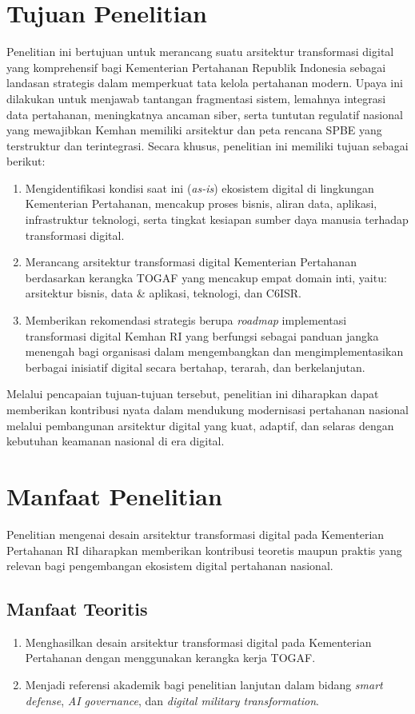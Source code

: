 \section{Tujuan Penelitian}
Penelitian ini bertujuan untuk merancang suatu arsitektur transformasi digital yang komprehensif bagi Kementerian Pertahanan Republik Indonesia sebagai landasan strategis dalam memperkuat tata kelola pertahanan modern.
Upaya ini dilakukan untuk menjawab tantangan fragmentasi sistem, lemahnya integrasi data pertahanan, meningkatnya ancaman siber, serta tuntutan regulatif nasional yang mewajibkan Kemhan memiliki arsitektur dan peta rencana SPBE yang terstruktur dan terintegrasi.
Secara khusus, penelitian ini memiliki tujuan sebagai berikut:
\begin{enumerate}
    \item Mengidentifikasi kondisi saat ini (\textit{as-is}) ekosistem digital di lingkungan Kementerian Pertahanan, mencakup proses bisnis, aliran data, aplikasi, infrastruktur teknologi, serta tingkat kesiapan sumber daya manusia terhadap transformasi digital.
    \item Merancang arsitektur transformasi digital Kementerian Pertahanan berdasarkan kerangka TOGAF yang mencakup empat domain inti,
    yaitu: arsitektur bisnis, data \& aplikasi, teknologi, dan C6ISR.
    \item Memberikan rekomendasi strategis berupa \textit{roadmap} implementasi transformasi digital Kemhan RI yang berfungsi sebagai
    panduan jangka menengah bagi organisasi dalam mengembangkan dan mengimplementasikan berbagai inisiatif digital secara bertahap, terarah, dan berkelanjutan.
\end{enumerate}
Melalui pencapaian tujuan-tujuan tersebut, penelitian ini diharapkan dapat memberikan kontribusi nyata dalam mendukung modernisasi pertahanan nasional
melalui pembangunan arsitektur digital yang kuat, adaptif, dan selaras dengan kebutuhan keamanan nasional di era digital.

\section{Manfaat Penelitian}
Penelitian mengenai desain arsitektur transformasi digital pada Kementerian Pertahanan RI diharapkan memberikan kontribusi teoretis 
maupun praktis yang relevan bagi pengembangan ekosistem digital pertahanan nasional.

\subsection{Manfaat Teoritis}
\begin{enumerate}
    \item Menghasilkan desain arsitektur transformasi digital pada Kementerian Pertahanan dengan menggunakan kerangka kerja TOGAF.
    \item Menjadi referensi akademik bagi penelitian lanjutan dalam bidang \textit{smart defense}, \textit{AI governance}, dan \textit{digital military transformation}.
\end{enumerate}

